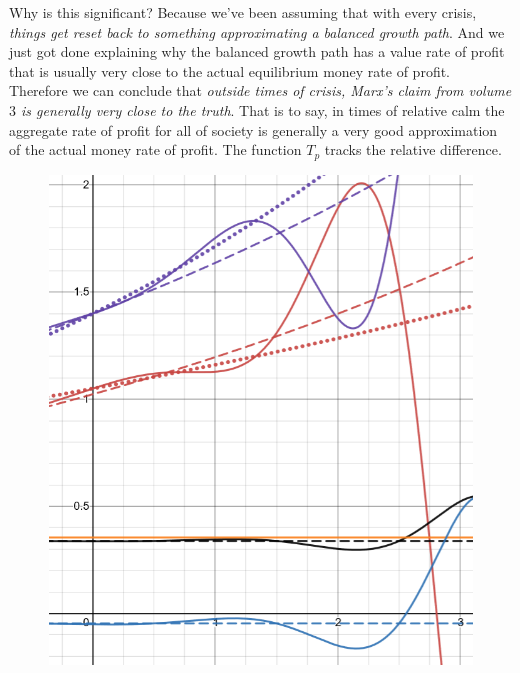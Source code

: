 \documentclass{article}
\theoremstyle{theorem}
\begin{document}
Why is this significant? Because we've been assuming that with every crisis, \emph{things get reset back to something approximating a balanced growth path}. And we just got done explaining why the balanced growth path has a value rate of profit that is usually very close to the actual equilibrium money rate of profit. Therefore we can conclude that \emph{outside times of crisis, Marx's claim from volume $3$ is generally very close to the truth}. That is to say, in times of relative calm the aggregate rate of profit for all of society is generally a very good approximation of the actual money rate of profit. The function $T_p$ tracks the relative difference. \par
\begin{figure}[H]
\centering
\includegraphics[scale=.8]{Images/theTransformation}
\end{figure}
\end{document}
